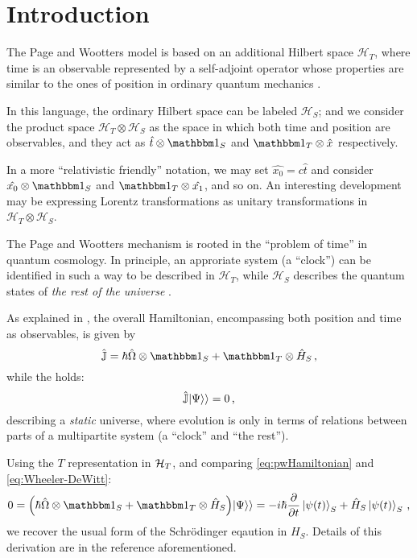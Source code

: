 \section{Introduction}

The Page and Wootters model is based on
an additional Hilbert space $\mathcal{H}_T$,
where time is an observable
represented by a self-adjoint operator
whose properties are similar to the ones of position
in ordinary quantum mechanics
\parencite{Lloyd:Time, Maccone:Pauli}.

In this language, the ordinary Hilbert space can be labeled $\mathcal{H}_S$;
and we consider the product space $\mathcal{H}_T \otimes \mathcal{H}_S$ as
the space in which both time and position are observables, and they act as
$\hat{t} \otimes \idop_S$ and $\idop_T \otimes \hat{x}$
respectively.

\begin{remark}
  In a more ``relativistic friendly'' notation, we may set
  $\hat{x_0} = c\hat{t}$ and consider
  $\hat{x_0} \otimes \idop_S$ and $\idop_T \otimes \hat{x_1}$,
  and so on. An interesting development may be expressing
  Lorentz transformations as unitary transformations in
  $\mathcal{H}_T \otimes \mathcal{H}_S$.
\end{remark}

The Page and Wootters mechanism is rooted in the ``problem of time''
in quantum cosmology.
In principle, an approriate system (a ``clock'') can be identified in such a way
to be described in $\mathcal{H}_T$, while $\mathcal{H}_S$ describes
the quantum states of \emph{the rest of the universe} \parencite{Marletto:Evolution}.

As explained in \cite{Lloyd:Time, Maccone:Pauli}, the overall Hamiltonian,
encompassing both position and time as observables, is given by
\begin{equation}\label{eq:pwHamiltonian}
  \hat{\mathbb{J}} = \hbar\hat{\Omega}\ox\idop_S + \idop_T\ox\hat{H}_S \,\text{,}
\end{equation}
while the  holds:
\begin{equation}\label{eq:Wheeler-DeWitt}
  \hat{\mathbb{J}}|\Psi\rangle\rangle = 0 \,\text{,}
\end{equation}
describing a \emph{static} universe, where evolution is only
in terms of relations between parts of a multipartite system
(a ``clock'' and ``the rest'').

Using the $T$ representation in $\mathcal{H}_T$,
and comparing \eqref{eq:pwHamiltonian} and \eqref{eq:Wheeler-DeWitt}:
\begin{equation}
  0 = \qty(\hbar\hat{\Omega}\ox\idop_S + \idop_{T}\ox\hat{H}_S)\dket{\Psi}
    = -i\hbar\pdv{t}\ket{\psi(t)}_{S} + \hat{H}_S\ket{\psi(t)}_{S}
    \,\text{,}
\end{equation}
we recover the usual form of the Schr\"{o}dinger eqaution in $H_S$.
Details of this derivation are in the reference aforementioned.

